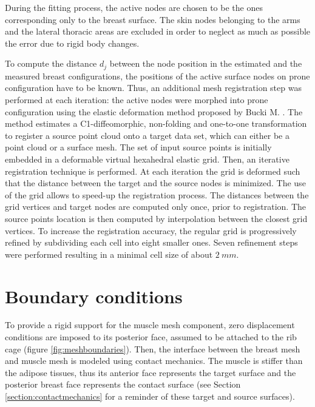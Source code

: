 During the fitting process, the active nodes are chosen to be the ones corresponding only to the breast surface. The skin nodes belonging to the  arms and the lateral thoracic areas are excluded  in order to neglect as much as possible the error due to rigid body changes.

To compute the distance $d_j$ between the node position in the estimated and the measured breast configurations, the  positions of the active surface nodes on prone configuration have to be known. Thus, an additional mesh registration step was performed at each iteration: the active nodes were morphed into prone configuration using the elastic deformation method proposed by Bucki M. \citep{bucki_fast_2010}. The method estimates a C1-diffeomorphic, non-folding and one-to-one transformation to register a source point cloud onto a target data set, which can either be a point cloud or a surface mesh.  The set of input source points is initially embedded in a deformable virtual hexahedral elastic grid. Then, an iterative registration technique is performed. At each iteration the grid is deformed such that the distance between the target and the source nodes is minimized. The use of the grid allows to speed-up the registration process. The distances between the grid vertices and target nodes are computed only once, prior to registration. The source points location is then computed by interpolation between the closest grid vertices. To increase the registration accuracy, the regular grid is progressively refined by subdividing each cell into eight smaller ones. Seven refinement steps were performed resulting in a minimal cell size of about $2\ mm$. 

\section{Boundary conditions}\label{section:myBoundayconditions}
To provide a rigid support for the muscle mesh component, zero displacement conditions are imposed to its posterior face, assumed to be attached to the rib cage (figure \ref{fig:meshboundaries}). Then, the interface between the breast mesh and muscle mesh is modeled using contact mechanics. The muscle is stiffer than the adipose tissues, thus its anterior face represents the target surface and the posterior breast face represents the contact surface (see Section \ref{section:contactmechanics} for a reminder of these target and source surfaces). 

